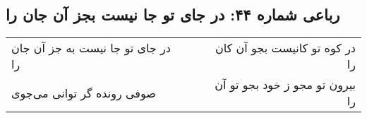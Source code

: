 \begin{center}
\section*{رباعی شماره ۴۴: در جای تو جا نیست بجز آن جان را}
\label{sec:0044}
\begin{longtable}{l p{0.5cm} r}
در جای تو جا نیست به جز آن جان را
&&
در کوه تو کانیست بجو آن کان را
\\
صوفی رونده گر توانی می‌جوی
&&
بیرون تو مجو ز خود بجو تو آن را
\\
\end{longtable}
\end{center}
